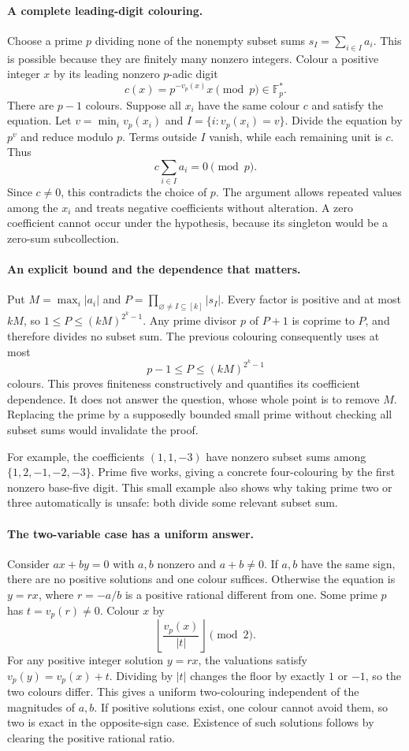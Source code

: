\documentclass[11pt,a4paper]{article}
\newcommand{\F}{\mathbb{F}}
\begin{document}
\paragraph{A complete leading-digit colouring.}
Choose a prime $p$ dividing none of the nonempty subset sums $s_I=\sum_{i\in I}a_i$. This is possible because they are finitely many nonzero integers. Colour a positive integer $x$ by its leading nonzero $p$-adic digit
\[
 c(x)=p^{-v_p(x)}x\pmod p\in\F_p^*.
\]
There are $p-1$ colours. Suppose all $x_i$ have the same colour $c$ and satisfy the equation. Let $v=\min_i v_p(x_i)$ and $I=\{i:v_p(x_i)=v\}$. Divide the equation by $p^v$ and reduce modulo $p$. Terms outside $I$ vanish, while each remaining unit is $c$. Thus
\[
 c\sum_{i\in I}a_i=0\pmod p.
\]
Since $c\ne0$, this contradicts the choice of $p$. The argument allows repeated values among the $x_i$ and treats negative coefficients without alteration. A zero coefficient cannot occur under the hypothesis, because its singleton would be a zero-sum subcollection.

\paragraph{An explicit bound and the dependence that matters.}
Put $M=\max_i|a_i|$ and $P=\prod_{\varnothing\ne I\subseteq[k]}|s_I|$. Every factor is positive and at most $kM$, so $1\leq P\leq(kM)^{2^k-1}$. Any prime divisor $p$ of $P+1$ is coprime to $P$, and therefore divides no subset sum. The previous colouring consequently uses at most
\[
 p-1\leq P\leq(kM)^{2^k-1}
\]
colours. This proves finiteness constructively and quantifies its coefficient dependence. It does not answer the question, whose whole point is to remove $M$. Replacing the prime by a supposedly bounded small prime without checking all subset sums would invalidate the proof.

For example, the coefficients $(1,1,-3)$ have nonzero subset sums among $\{1,2,-1,-2,-3\}$. Prime five works, giving a concrete four-colouring by the first nonzero base-five digit. This small example also shows why taking prime two or three automatically is unsafe: both divide some relevant subset sum.

\paragraph{The two-variable case has a uniform answer.}
Consider $ax+by=0$ with $a,b$ nonzero and $a+b\ne0$. If $a,b$ have the same sign, there are no positive solutions and one colour suffices. Otherwise the equation is $y=rx$, where $r=-a/b$ is a positive rational different from one. Some prime $p$ has $t=v_p(r)\ne0$. Colour $x$ by
\[
 \left\lfloor\frac{v_p(x)}{|t|}\right\rfloor\pmod2.
\]
For any positive integer solution $y=rx$, the valuations satisfy $v_p(y)=v_p(x)+t$. Dividing by $|t|$ changes the floor by exactly $1$ or $-1$, so the two colours differ. This gives a uniform two-colouring independent of the magnitudes of $a,b$. If positive solutions exist, one colour cannot avoid them, so two is exact in the opposite-sign case. Existence of such solutions follows by clearing the positive rational ratio.
\end{document}
